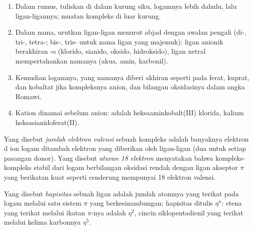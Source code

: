 \begin{method}\label{met:b2:coordination-complexes:naming}
\begin{enumerate}
  \item Dalam rumus, tuliskan  di dalam kurung siku, logamnya
        lebih dahulu, lalu ligan-ligannya; muatan kompleks di luar kurung.
  \item Dalam nama, urutkan ligan-ligan menurut abjad dengan awalan pengali
        (di-, tri-, tetra-; bis-, tris- untuk nama ligan yang majemuk): ligan
        anionik berakhiran -o (klorido, sianido, oksido, hidroksido), ligan
        netral mempertahankan namanya (akua, amin, karbonil).
  \item Kemudian logamnya, yang namanya diberi akhiran seperti pada ferat,
        kuprat, dan kobaltat jika kompleksnya anion, dan bilangan oksidasinya
        dalam angka Romawi.
  \item Kation dinamai sebelum anion:  adalah
        heksaaminkobalt(III) klorida,  kalium
        heksasianidoferat(II).
\end{enumerate}
\end{method}

\begin{definition}\label{def:b2:coordination-complexes:electron-count}
Yang disebut \emph{jumlah elektron valensi}
sebuah kompleks adalah banyaknya elektron d ion logam ditambah elektron
yang diberikan oleh ligan-ligan (dua untuk setiap pasangan donor). Yang
disebut \emph{aturan 18 elektron} menyatakan bahwa
kompleks-kompleks stabil dari logam berbilangan oksidasi rendah dengan
ligan akseptor $\pi$ yang berikatan kuat seperti  cenderung mempunyai
18 elektron valensi.
\end{definition}

\begin{definition}[Hapisitas]\label{def:b2:coordination-complexes:hapticity}
Yang disebut \emph{hapisitas} sebuah ligan adalah jumlah
atomnya yang terikat pada logam melalui satu sistem $\pi$ yang
berkesinambungan; hapisitas ditulis $\eta^n$: etena yang terikat melalui
ikatan $\pi$-nya adalah $\eta^2$, cincin siklopentadienil yang terikat melalui
kelima karbonnya $\eta^5$.
\end{definition}

